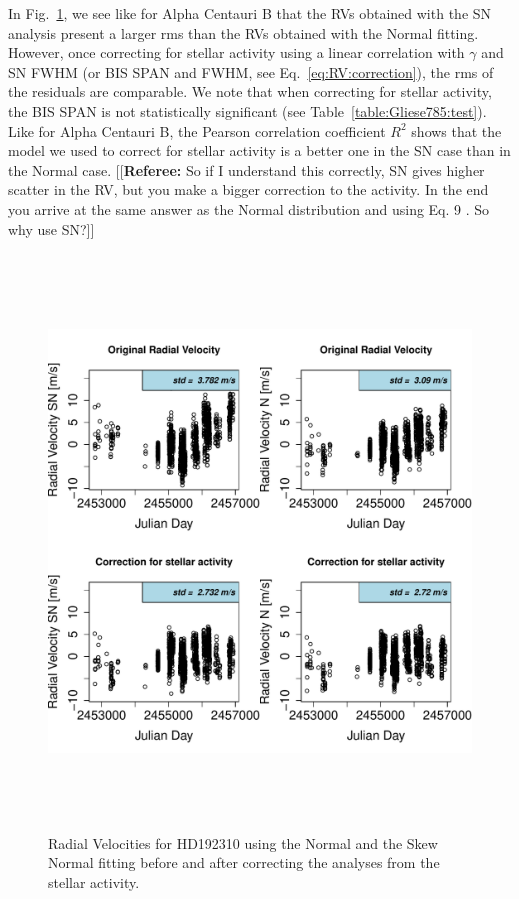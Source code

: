 \documentclass[11pt, oneside]{article}
\newcommand{\comment}[1]{{\color{red}[[\textbf{Referee: }#1]]}}
\begin{document}
In Fig.~\ref{fig:Gliese785:correctionRV}, we see like for Alpha Centauri B that the RVs obtained with the SN analysis present a larger rms than the RVs obtained with the Normal fitting. However, once correcting for stellar activity using a linear correlation with $\gamma$ and SN FWHM (or BIS SPAN and FWHM, see Eq.~\ref{eq:RV:correction}), the rms of the residuals are comparable. We note that when correcting for stellar activity, the BIS SPAN is not statistically significant (see Table~\ref{table:Gliese785:test}). Like for Alpha Centauri B, the Pearson correlation coefficient $R^{2}$ shows  that the model we used to correct for stellar activity is a better one in the SN case than in the Normal case.
\comment{So if I understand this correctly, SN gives higher scatter in the RV, but you make a bigger correction to the activity. In the end you arrive at the same answer as the Normal distribution and using Eq. 9 . So why use SN?}
%
\begin{figure}[htbp]
   \centering
\includegraphics[height = 6in]{HD19231_[3]CorrectionActivity_RadialVelocity_vs_time.pdf} 
   \caption{Radial Velocities for HD192310 using the Normal and the Skew Normal fitting before and after correcting the analyses from the stellar activity.}
   \label{fig:Gliese785:correctionRV}
\end{figure}
\end{document}
